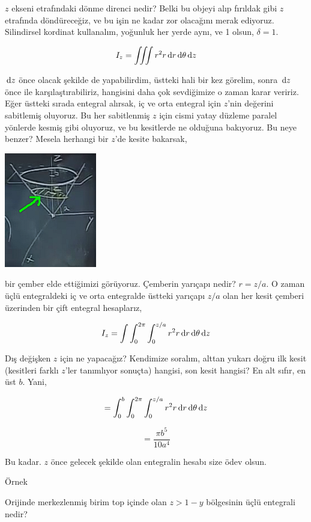 \documentclass[12pt,fleqn]{article}\usepackage{../../common}
\begin{document}
$z$ ekseni etrafındaki dönme direnci nedir? Belki bu objeyi alıp fırıldak
gibi $z$ etrafında döndüreceğiz, ve bu işin ne kadar zor olacağını merak
ediyoruz. Silindirsel kordinat kullanalım, yoğunluk her yerde aynı, ve 1
olsun, $\delta = 1$.

$$ 
I_z = \iiint r^2 r \,\mathrm{d} r \,\mathrm{d} \theta \,\mathrm{d} z
$$

$\,\mathrm{d} z$ önce olacak şekilde de yapabilirdim, üstteki hali bir kez görelim,
sonra $\,\mathrm{d} z$ önce ile karşılaştırabiliriz, hangisini daha çok sevdiğimize
o zaman karar veririz. Eğer üstteki sırada entegral alırsak, iç ve orta
entegral için $z$'nin değerini sabitlemiş oluyoruz. Bu her sabitlenmiş $z$
için cismi yatay düzleme paralel yönlerde kesmiş gibi oluyoruz, ve bu
kesitlerde ne olduğuna bakıyoruz. Bu neye benzer? Mesela herhangi bir
$z$'de kesite bakarsak, 

\begin{center}
\includegraphics[height=5cm]{25_12.png}
\end{center}

bir çember elde ettiğimizi görüyoruz. Çemberin yarıçapı nedir? $r = z/a$. O
zaman üçlü entegraldeki iç ve orta entegralde üstteki yarıçapı $z/a$ olan
her kesit çemberi üzerinden bir çift entegral hesaplarız,

$$ 
I_z = \int \int _{0}^{2\pi} \int _{0}^{z/a} r^2 r \,\mathrm{d} r \,\mathrm{d} \theta \,\mathrm{d} z
$$

Dış değişken $z$ için ne yapacağız? Kendimize soralım, alttan yukarı doğru
ilk kesit (kesitleri farklı $z$'ler tanımlıyor sonuçta) hangisi, son kesit
hangisi? En alt sıfır, en üst $b$. Yani,

$$ 
 = \int _{0}^{b} \int _{0}^{2\pi} \int _{0}^{z/a} r^2 r \,\mathrm{d} r \,\mathrm{d} \theta \,\mathrm{d} z
$$

$$ = \frac{\pi b^5}{10 a^4}$$

Bu kadar. $z$ önce gelecek şekilde olan entegralin hesabı size ödev olsun. 

Örnek

Orijinde merkezlenmiş birim top içinde olan $z > 1-y$ bölgesinin üçlü
entegrali nedir? 
\end{document}
